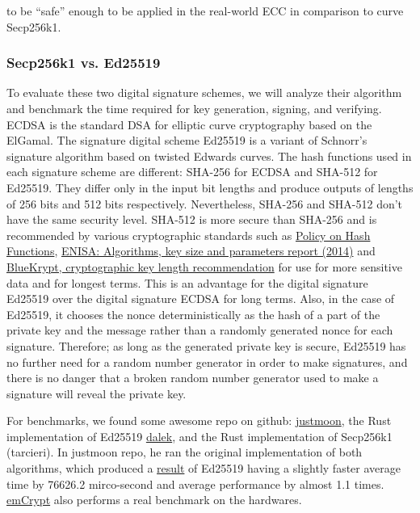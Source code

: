 to be “safe” enough to be applied in the real-world ECC in comparison to curve Secp256k1.


\subsubsection{Secp256k1 vs. Ed25519}

To evaluate these two digital signature schemes, we will analyze their algorithm and benchmark the time required for key generation, signing, and verifying. ECDSA is the standard DSA for elliptic curve cryptography based on the ElGamal. The signature digital scheme Ed25519 is a variant of Schnorr’s signature algorithm based on twisted Edwards curves. The hash functions used in each signature scheme are different: SHA-256 for ECDSA and SHA-512 for Ed25519. They differ only in the input bit lengths and produce outputs of lengths of 256 bits and 512 bits respectively. Nevertheless, SHA-256 and SHA-512 don’t have the same security level. SHA-512 is more secure than SHA-256 and is recommended by various cryptographic standards such as \href{https://csrc.nist.gov/projects/hash-functions/nist-policy-on-hash-functions}{Policy on Hash Functions}, \href{https://www.enisa.europa.eu/publications}{ENISA: Algorithms, key size and parameters report (2014)} and \href{https://www.keylength.com/en/}{BlueKrypt, cryptographic key length recommendation} for use for more sensitive data and for longest terms. This is an advantage for the digital signature Ed25519 over the digital signature ECDSA for long terms. Also, in the case of Ed25519, it chooses the nonce deterministically as the hash of a part of the private key and the message rather than a randomly generated nonce for each signature. Therefore; as long as the generated private key is secure, Ed25519 has no further need for a random number generator in order to make signatures, and there is no danger that a broken random number generator used to make a signature will reveal the private key.

For benchmarks, we found some awesome repo on github: \href{https://github.com/justmoon/curvebench}{justmoon}, the Rust implementation of Ed25519 \href{https://github.com/dalek-cryptography/ed25519-dalek}{dalek}, and the Rust implementation of Secp256k1 (tarcieri). In justmoon repo, he ran the original implementation of both algorithms, which produced a \href{http://justmoon.github.io/curvebench/benchmark.html}{result} of Ed25519 having a slightly faster average time by 76626.2 mirco-second and average performance by almost 1.1 times. \href{https://wiki.segger.com/emCrypt}{emCrypt} also performs a real benchmark on the hardwares.

